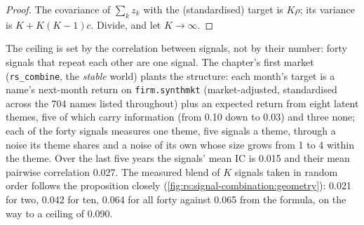 \begin{proof}
The covariance of $\sum_k z_k$ with the (standardised) target is $K\rho$; its variance is $K + K(K-1)c$. Divide, and let $K \to \infty$.
\end{proof}

The ceiling is set by the correlation between signals, not by their number: forty signals that repeat each other are one signal. The
chapter's first market (\texttt{rs\_combine}, the \emph{stable} world) plants the structure: each month's target is a name's next-month
return on \texttt{firm.synthmkt} (market-adjusted, standardised across the 704 names listed throughout) plus an expected return from eight
latent themes, five of which carry information (from 0.10 down to 0.03) and three none; each of the forty signals measures one theme, five
signals a theme, through a noise its theme shares and a noise of its own whose size grows from 1 to 4 within the theme. Over the last five
years the signals' mean IC is 0.015 and their mean pairwise correlation 0.027. The measured blend of $K$ signals taken in random order follows
the proposition closely (\cref{fig:rs:signal-combination:geometry}): 0.021 for two, 0.042 for ten, 0.064 for all forty against 0.065 from
the formula, on the way to a ceiling of 0.090.

\begin{omfigure}

\label{fig:rs:signal-combination:geometry}
\end{omfigure}

